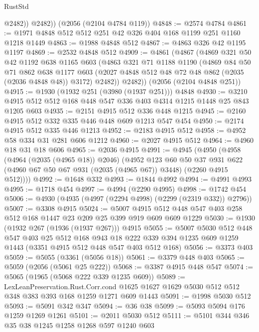 \begin{lexlean}{RustStd}
\begin{coremodule}
            @2482))
        @2482))
    (@2056 (@2104 @4784 @119))
@4848 := @2574 @4784
@4861 := @1971 @4848 @512 @512 @251 @42 @326 @404 @168 @1199 @251 @1160 @1218 @1449
@4863 := @1988 @4848 @512
@4867 := @4863 @326 @42 @1195 @1197
@4869 := @2532 @4848 @512
@4909 := @4861
    (@4867
      (@4869
        @321
        @50
        @42
        @1192
        @638
        @1165
        @603
        (@4863
          @321
          @71
          @1188
          @1190
          (@4869
            @84
            @50
            @71
            @862
            @638
            @1177
            @603
            (@2027 @4848 @512 @48 @72 @48 @862 (@2035 (@2036 @4848 @48)) @3172)
            @2482))
        @2482))
    (@2056 (@2104 @4848 @251))
@4915 := @1930 (@1932 @251 (@3980 (@1937 @251))) @4848
@4930 := @3210 @4915 @512 @512 @168 @448 @547 @336 @403 @4314 @1215 @1448 @25 @843 @1205 @603
@4935 := @2151 @4915 @512 @336 @448 @1215
@4945 := @2160 @4915 @512 @332 @335 @446 @448 @609 @1213 @547 @454
@4950 := @2174 @4915 @512 @335 @446 @1213
@4952 := @2183 @4915 @512
@4958 := @4952 @58 @334 @31 @281 @606 @1212
@4960 := @2027 @4915 @512
@4964 := @4960 @18 @31 @18 @606
@4965 := @2036 @4915
@4991 := @4945
    (@4950
      (@4958
        (@4964 (@2035 (@4965 @18)) @2046)
        (@4952
          @123
          @60
          @50
          @37
          @931
          @622
          (@4960 @67 @50 @67 @931 (@2035 (@4965 @67)) @3448)
          (@2260 @4915 @512))))
@4992 := @1648 @332
@4993 := @1844 @4992
@4994 := @4991 @4993
@4995 := @1718 @454
@4997 := @4994 (@2290 @4995)
@4998 := @1742 @454
@5006 := @4930 (@4935 (@4997 (@2294 @4998) (@2299 (@2319 @332)) @2796))
@5007 := @3308 @4915
@5024 := @5007 @4915 @512 @448 @547 @403 @258 @512 @168 @1447 @23 @209 @25 @399 @919 @609 @609 @1229
@5030 := @1930 (@1932 @267 (@1936 (@1937 @267))) @4915
@5055 := @5007
    @5030
    @512
    @448
    @547
    @403
    @25
    @512
    @168
    @943
    @18
    @222
    @339
    @394
    @1235
    @609
    @1259
    @1443
    (@3351 @4915 @512 @448 @547 @403 @512 @168)
@5056 := @3373 @403
@5059 := @5055 (@3361 (@5056 @18))
@5061 := @3379 @448 @403
@5065 := @5059 (@2056 (@5061 @25 @222))
@5068 := @3387 @4915 @448 @547
@5074 := @5065 (@1965 (@5068 @222 @339 @1235 @609))
@5089 := LexLeanPreservation.Rust.Corr.cond
    @1625
    @1627
    @1629
    @5030
    @512
    @512
    @348
    @383
    @393
    @168
    @1259
    @1271
    @609
    @1443
@5091 := @1998 @5030 @512
@5093 := @5091 @342 @347
@5094 := @36 @38
@5099 := @5093 @5094 @176 @1259 @1269 @1261
@5101 := @2011 @5030 @512
@5111 := @5101 @344 @346 @35 @38 @1245 @1258 @1268 @597 @1240 @603

\end{coremodule}
\end{lexlean}
